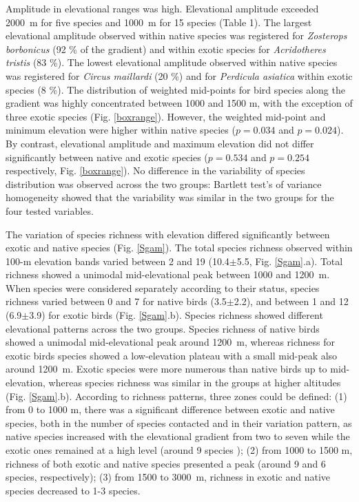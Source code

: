 \documentclass{article}
\begin{document}
Amplitude in elevational ranges was high. Elevational amplitude exceeded 2000~m for five species and 1000~m for 15 species (Table 1). The largest elevational amplitude observed within native species was registered for \textit{Zosterops borbonicus} (92 \% of the gradient) and within exotic species for \textit{Acridotheres tristis} (83 \%). The lowest elevational amplitude observed within native species was registered for \textit{Circus maillardi} (20 \%) and for \textit{Perdicula asiatica} within exotic species (8 \%). The distribution of weighted mid-points for bird species along the gradient was highly concentrated between 1000 and 1500 m, with the exception of three exotic species (Fig. \ref{boxrange}). However, the weighted mid-point and minimum elevation were higher within native species ($p=0.034$ and $p=0.024$). By contrast, elevational amplitude and maximum elevation did not differ significantly between native and exotic species ($p=0.534$ and $p=0.254$ respectively, Fig. \ref{boxrange}). No difference in the variability of species distribution was observed across the two groups: Bartlett test's of variance homogeneity showed that the variability was similar in the two groups for the four tested variables.

The variation of species richness with elevation differed significantly between exotic and native species (Fig. \ref{Sgam}). 
The total species richness observed within 100-m elevation bands varied between 2 and 19 (10.4$\pm$5.5, Fig. \ref{Sgam}.a). Total richness showed a unimodal mid-elevational peak between 1000 and 1200~m. When species were considered separately according to their status,  species richness varied between 0 and 7 for native birds (3.5$\pm$2.2), and between 1 and 12 (6.9$\pm$3.9) for exotic birds (Fig. \ref{Sgam}.b). Species richness showed different elevational patterns across the two groups. Species richness of native birds showed a unimodal mid-elevational peak around 1200~m, whereas richness for exotic birds species showed a low-elevation plateau with a small mid-peak also around 1200~m. Exotic species were more numerous than native birds up to mid-elevation, whereas species richness was similar in the groups at higher altitudes (Fig. \ref{Sgam}.b). According to richness patterns, three zones could be defined: (1) from 0 to 1000 m, there was a significant difference between exotic and native species, both in the number of species contacted and in their variation pattern, as native species increased with the elevational gradient from two to seven while the exotic ones remained at a high level (around 9 species ); (2) from 1000 to 1500 m, richness of both exotic and native species presented a peak (around 9 and 6 species, respectively); (3) from 1500 to 3000~m, richness in exotic and native species decreased to 1-3 species. 
\end{document}
